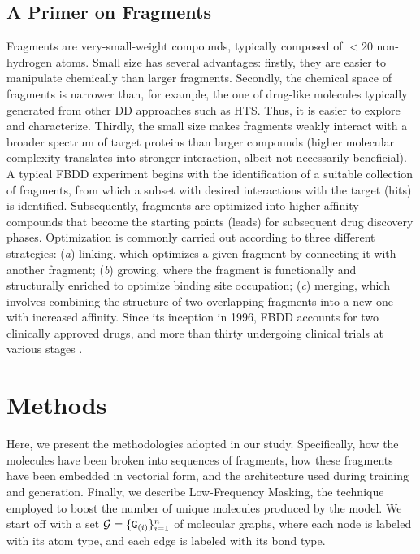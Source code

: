 \subsection{A Primer on Fragments}
Fragments are very-small-weight compounds, typically composed of $<20$ non-hydrogen atoms. Small size has several advantages: firstly, they are easier to manipulate chemically than larger fragments. Secondly, the chemical space of fragments is narrower than, for example, the one of drug-like molecules typically generated from other DD approaches such as HTS. Thus, it is easier to explore and characterize. Thirdly, the small size makes fragments weakly interact with a broader spectrum of target proteins than larger compounds (higher molecular complexity translates into stronger interaction, albeit not necessarily beneficial). A typical FBDD experiment begins with the identification of a suitable collection of fragments, from which a subset with desired interactions with the target (hits) is identified. Subsequently, fragments are optimized into higher affinity compounds that become the starting points (leads) for subsequent drug discovery phases. Optimization is commonly carried out according to three different strategies: (\emph{a}) linking, which optimizes a given fragment by connecting it with another fragment; (\emph{b}) growing, where the fragment is functionally and structurally enriched to optimize binding site occupation; (\emph{c}) merging, which involves combining the structure of two overlapping fragments into a new one with increased affinity.
Since its inception in 1996, FBDD accounts for two clinically approved drugs, and more than thirty undergoing clinical trials at various stages \citep{davis2017fbdd}.

\section{Methods}\label{sec:aistats-methods}
Here, we present the methodologies adopted in our study. Specifically, how the molecules have been broken into sequences of fragments, how these fragments have been embedded in vectorial form, and the architecture used during training and generation. Finally, we describe Low-Frequency Masking, the technique employed to boost the number of unique molecules produced by the model. We start off with a set $\mathcal{G} = \{\PatternGraph{G}{i}\}_{i=1}^n$ of molecular graphs, where each node is labeled with its atom type, and each edge is labeled with its bond type.

